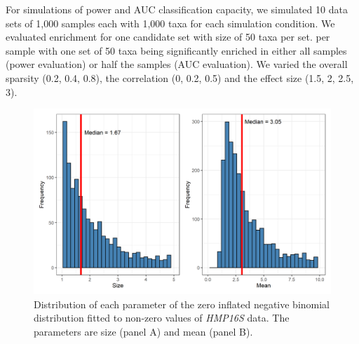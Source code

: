 \documentclass{article}
\begin{document}
\noindent For simulations of power and AUC classification capacity, we simulated 10 data sets of 1,000 samples each with 1,000 taxa for each simulation condition. We evaluated enrichment for one candidate set with size of 50 taxa per set.  per sample with one set of 50 taxa being significantly enriched in either all samples (power evaluation) or half the samples (AUC evaluation). We varied the overall sparsity (0.2, 0.4, 0.8), the correlation (0, 0.2, 0.5) and the effect size (1.5, 2, 2.5, 3).



\begin{figure}[h]
    \centering
    \includegraphics[width=0.6\linewidth]{figures/HMP_fit_nonzero.png}
    \caption{Distribution of each parameter of the zero inflated negative binomial distribution fitted to non-zero values of \emph{HMP16S} data. The parameters are size (panel A) and mean (panel B).}
\end{figure}


\newpage
{}

\end{document}
